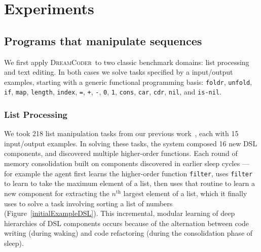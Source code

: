 \documentclass{article}
\newcommand{\system}{\textsc{DreamCoder}~}
\newcommand{\code}[1]{{\footnotesize\texttt{#1}}}
\begin{document}
\section{Experiments}

\subsection{Programs that manipulate sequences}\label{sequences}
We first apply \system to two classic benchmark domains: list
processing and text editing. In both cases we solve tasks specified by
a input/output examples, starting with a generic functional programming
basis: \code{foldr}, \code{unfold}, \code{if}, \code{map},
\code{length}, \code{index}, \code{=}, \code{+}, \code{-}, \code{0},
\code{1}, \code{cons}, \code{car}, \code{cdr}, \code{nil}, and
\code{is-nil}.

\subsubsection{List Processing}\label{listSection}
We took 218 list manipulation tasks from our previous work~\cite{ecc},
each with 15 input/output examples.  In solving these tasks, the
system composed 16 new DSL components, and discovered multiple
higher-order functions. Each round of memory consolidation built on
components discovered in earlier sleep cycles --- for example the
agent first learns the higher-order function \code{filter}, uses
\code{filter} to learn to take the maximum element of a list, then
uses that routine to learn a new component for extracting the
$n^{\text{th}}$ largest element of a list, which it finally uses to
solve a task involving sorting a list of numbers (Figure~\ref{initialExampleDSL}).
This incremental, modular learning of deep hierarchies of DSL
components occurs because of the alternation between code writing
(during waking) and code refactoring (during the consolidation phase
of sleep).

\end{document}
